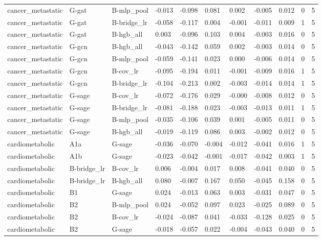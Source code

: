 \begin{table}[t]
\begin{tabular}{lllllllllll}
cancer\_metastatic & G-gat & B-mlp\_pool & -0.013 & -0.098 & 0.081 & 0.002 & -0.005 & 0.012 & 0 & 5 \\
cancer\_metastatic & G-gat & B-bridge\_lr & -0.058 & -0.117 & 0.004 & -0.001 & -0.011 & 0.009 & 1 & 5 \\
cancer\_metastatic & G-gat & B-hgb\_all & 0.003 & -0.096 & 0.103 & 0.004 & -0.003 & 0.016 & 0 & 5 \\
cancer\_metastatic & G-gcn & B-hgb\_all & -0.043 & -0.142 & 0.059 & 0.002 & -0.003 & 0.014 & 0 & 5 \\
cancer\_metastatic & G-gcn & B-mlp\_pool & -0.059 & -0.141 & 0.023 & 0.000 & -0.006 & 0.014 & 0 & 5 \\
cancer\_metastatic & G-gcn & B-cov\_lr & -0.095 & -0.194 & 0.011 & -0.001 & -0.009 & 0.016 & 1 & 5 \\
cancer\_metastatic & G-gcn & B-bridge\_lr & -0.104 & -0.213 & 0.002 & -0.003 & -0.014 & 0.014 & 1 & 5 \\
cancer\_metastatic & G-sage & B-cov\_lr & -0.072 & -0.176 & 0.029 & -0.000 & -0.008 & 0.012 & 0 & 5 \\
cancer\_metastatic & G-sage & B-bridge\_lr & -0.081 & -0.188 & 0.023 & -0.003 & -0.013 & 0.011 & 1 & 5 \\
cancer\_metastatic & G-sage & B-mlp\_pool & -0.035 & -0.106 & 0.039 & 0.001 & -0.005 & 0.011 & 0 & 5 \\
cancer\_metastatic & G-sage & B-hgb\_all & -0.019 & -0.119 & 0.086 & 0.003 & -0.002 & 0.012 & 0 & 5 \\
cardiometabolic & A1a & G-sage & -0.036 & -0.070 & -0.004 & -0.012 & -0.041 & 0.016 & 1 & 5 \\
cardiometabolic & A1b & G-sage & -0.023 & -0.042 & -0.001 & -0.017 & -0.042 & 0.003 & 1 & 5 \\
cardiometabolic & B-bridge\_lr & B-cov\_lr & 0.006 & -0.004 & 0.017 & 0.008 & -0.041 & 0.040 & 0 & 5 \\
cardiometabolic & B-bridge\_lr & B-hgb\_all & 0.080 & -0.007 & 0.167 & 0.050 & -0.045 & 0.158 & 0 & 5 \\
cardiometabolic & B1 & G-sage & 0.024 & -0.013 & 0.063 & 0.003 & -0.031 & 0.047 & 0 & 5 \\
cardiometabolic & B2 & B-mlp\_pool & 0.024 & -0.052 & 0.097 & 0.023 & -0.025 & 0.089 & 0 & 5 \\
cardiometabolic & B2 & B-cov\_lr & -0.024 & -0.087 & 0.041 & -0.033 & -0.128 & 0.025 & 0 & 5 \\
cardiometabolic & B2 & G-sage & -0.018 & -0.057 & 0.022 & -0.004 & -0.043 & 0.040 & 0 & 5 \\

\end{tabular}
\end{table}
